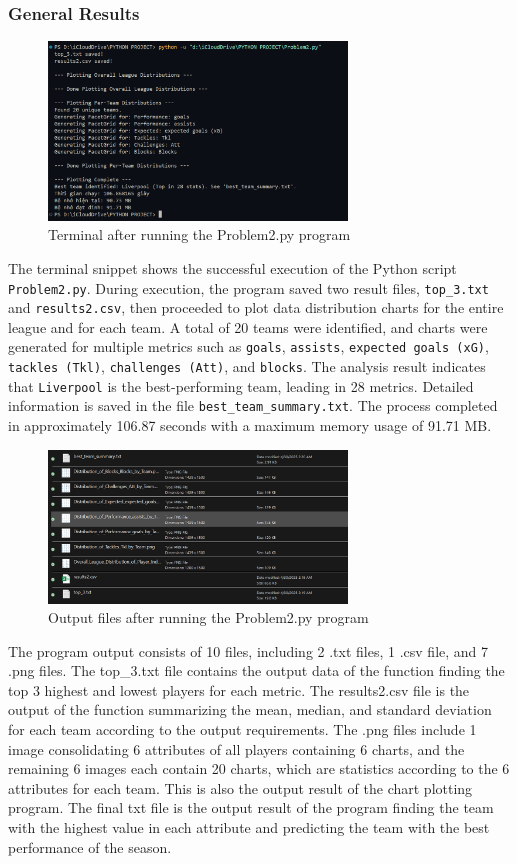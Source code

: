 \documentclass[12pt]{report}
\begin{document}
{{\subsubsection{General Results} %
\begin{figure}[h]
    \centering
    \includegraphics[width=300px]{Terminal_2.png}
    \caption{Terminal after running the Problem2.py program} %
    \label{fig:terminal2}
\end{figure}
The terminal snippet shows the successful execution of the Python script \texttt{Problem2.py}. During execution, the program saved two result files, \texttt{top\_3.txt} and \texttt{results2.csv}, then proceeded to plot data distribution charts for the entire league and for each team. A total of 20 teams were identified, and charts were generated for multiple metrics such as \texttt{goals}, \texttt{assists}, \texttt{expected goals (xG)}, \texttt{tackles (Tkl)}, \texttt{challenges (Att)}, and \texttt{blocks}. The analysis result indicates that \texttt{Liverpool} is the best-performing team, leading in 28 metrics. Detailed information is saved in the file \texttt{best\_team\_summary.txt}. The process completed in approximately 106.87 seconds with a maximum memory usage of 91.71 MB.

\begin{figure}[h]
    \centering
    \includegraphics[width=300px]{P2_RES.png}
    \caption{Output files after running the Problem2.py program} %
    \label{fig:output}
\end{figure}
The program output consists of 10 files, including 2 .txt files, 1 .csv file, and 7 .png files. The top\_3.txt file contains the output data of the function finding the top 3 highest and lowest players for each metric. The results2.csv file is the output of the function summarizing the mean, median, and standard deviation for each team according to the output requirements. The .png files include 1 image consolidating 6 attributes of all players containing 6 charts, and the remaining 6 images each contain 20 charts, which are statistics according to the 6 attributes for each team. This is also the output result of the chart plotting program. The final txt file is the output result of the program finding the team with the highest value in each attribute and predicting the team with the best performance of the season.
}}
\end{document}

